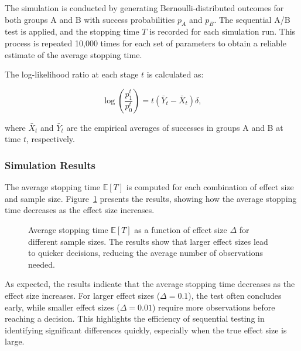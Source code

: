 \documentclass[magisterska, english]{pwr_wmat_praca_dyplomowa}
\theoremstyle{plain}
\numberwithin{theorem}{chapter}
\theoremstyle{definition}
\numberwithin{theorem}{chapter}
\begin{document}
The simulation is conducted by generating Bernoulli-distributed outcomes for both groups A and B with success probabilities \( p_A \) and \( p_B \). The sequential A/B test is applied, and the stopping time \( T \) is recorded for each simulation run. This process is repeated 10,000 times for each set of parameters to obtain a reliable estimate of the average stopping time.

The log-likelihood ratio at each stage \( t \) is calculated as:

\[
\log \left(\frac{p_1^t}{p_0^t}\right) = t(\bar{Y}_t - \bar{X}_t)\delta,
\]

where \( \bar{X}_t \) and \( \bar{Y}_t \) are the empirical averages of successes in groups A and B at time \( t \), respectively.

\subsubsection{Simulation Results}

The average stopping time \( \mathbb{E}[T] \) is computed for each combination of effect size and sample size. Figure~\ref{fig:avg_stopping_time} presents the results, showing how the average stopping time decreases as the effect size increases.

\begin{figure}[H]
	\centering
	\caption{Average stopping time \( \mathbb{E}[T] \) as a function of effect size \( \Delta \) for different sample sizes. The results show that larger effect sizes lead to quicker decisions, reducing the average number of observations needed.}
	\label{fig:avg_stopping_time}
\end{figure}

As expected, the results indicate that the average stopping time decreases as the effect size increases. For larger effect sizes (\( \Delta = 0.1 \)), the test often concludes early, while smaller effect sizes (\( \Delta = 0.01 \)) require more observations before reaching a decision. This highlights the efficiency of sequential testing in identifying significant differences quickly, especially when the true effect size is large.
\end{document}
